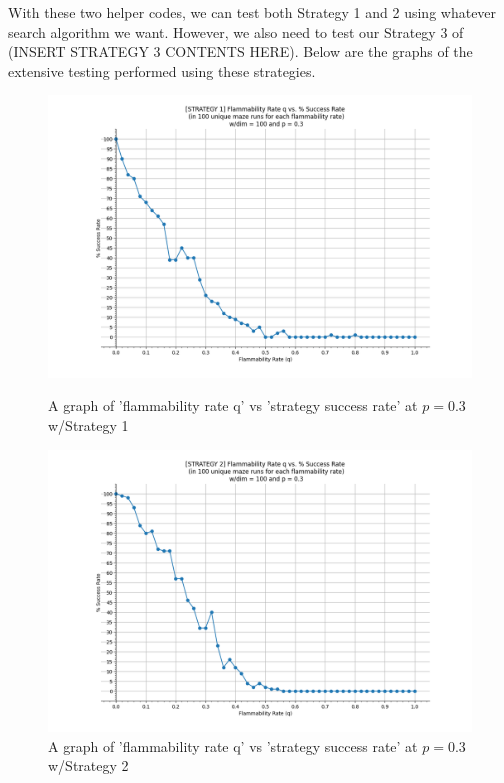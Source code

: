 \documentclass[11pt]{article}
\begin{document}
With these two helper codes, we can test both Strategy 1 and 2 using whatever search algorithm we want. However, we also need to test our Strategy 3 of (INSERT STRATEGY 3 CONTENTS HERE). Below are the graphs of the extensive testing performed using these strategies.
\begin{figure}[!]
\centering
\includegraphics[scale=0.50]{Strategy1_q_successRate.PNG}
\caption{A graph of 'flammability rate q' vs 'strategy success rate' at $p = 0.3$ w/Strategy 1}
\includegraphics[scale=0.50]{Strategy2_q_successRate.PNG}
\caption{A graph of 'flammability rate q' vs 'strategy success rate' at $p = 0.3$ w/Strategy 2}
\end{figure}
\end{document}

